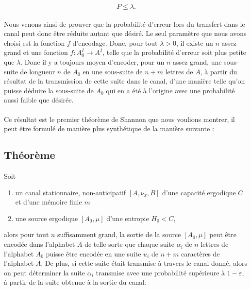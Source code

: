 	\[P\le \lambda.\]
	
	\paragraph{}Nous venons ainsi de prouver que la probabilité d'erreur lors 
	du transfert dans le canal peut donc être réduite autant que désiré.
	Le seul paramètre que nous avons choisi est la fonction $f$ d'encodage.
	Donc, pour tout $\lambda >0$, il existe un $n$ assez grand et
	une fonction $f : A_0^I \to A^I$, telle que la probabilité d'erreur 
	soit plus petite que $\lambda$. Donc il y a toujours moyen d'encoder,
	pour un $n$ assez grand, une sous-suite de longueur $n$ de $A_0$ 
	en une sous-suite de $n+m$ lettres de $A$, à partir du résultat 
	de la transmission de cette suite dans le canal, d'une manière telle
	qu'on puisse déduire la sous-suite de $A_0$ qui en a été à l'origine 
	avec une probabilité aussi faible que désirée.
	
	\paragraph{}
	Ce résultat est le premier théorème de Shannon que nous voulions montrer,
	il peut être formulé de manière plus synthétique de la manière suivante :
	
\subsection*{Théorème}
	
	\paragraph{}
	Soit 
	\begin{enumerate}
		\item un canal stationnaire, non-anticipatif $[A,\nu_x,B]$ d'une 
			capacité ergodique $C$ et d'une mémoire finie $m$
		\item une source ergodique $[A_0,\mu]$ d'une entropie $H_0<C$,
	\end{enumerate}
	alors pour tout $n$ suffisamment grand, la sortie de la source
	$[A_0,\mu]$ peut être encodée dans l'alphabet $A$ de telle sorte que
	chaque suite $\alpha_i$ de $n$ lettres de l'alphabet $A_0$ puisse
	être encodée en une suite $u_i$ de $n+m$ caractères de l'alphabet $A$. 
	De plus, si cette suite était transmise à travers le canal donné, alors
	on peut déterminer la suite $\alpha_i$ transmise avec une probabilité 
	supérieure à $1-\varepsilon$, à partir de la suite obtenue à la sortie 
	du canal.
	
